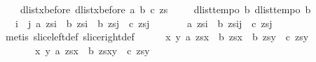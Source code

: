 \begin{isabellebody}
\ \ \ \ {\isacharparenleft}dlist{\isacharunderscore}xbefore\ {\isacharparenleft}dlist{\isacharunderscore}xbefore\ a\ b{\isacharparenright}\ c{\isacharparenright}\ zs{\isachardoublequoteclose}\isanewline
%
\isadelimproof
%
\endisadelimproof
%
\isatagproof
{}\isamarkupfalse%
{\isacharminus}\isanewline
\ \ \isamarkupfalse%
\ {}{\isacharcolon}\ {\isachardoublequoteopen}dlist{\isacharunderscore}tempo{}\ b{\isachardoublequoteclose}\ {\isachardoublequoteopen}dlist{\isacharunderscore}tempo{}\ b{\isachardoublequoteclose}\ \isanewline
\ \ \isamarkupfalse%
\ {}{\isacharcolon}\ {\isachardoublequoteopen}{\isasymexists}\ i{\isachardot}\ {\isacharparenleft}{\isasymexists}\ j{\isachardot}\ a\ {\isacharparenleft}zs{\isasymdagger}{\isachardot}{\isachardot}i{\isacharparenright}\ {\isasymand}\ b\ {\isacharparenleft}zs{\isasymdagger}i{\isachardot}{\isachardot}{\isacharparenright}\ {\isasymand}\ b\ {\isacharparenleft}zs{\isasymdagger}{\isachardot}{\isachardot}j{\isacharparenright}\ {\isasymand}\ c\ {\isacharparenleft}zs{\isasymdagger}j{\isachardot}{\isachardot}{\isacharparenright}\ {\isasymlongleftrightarrow}\isanewline
\ \ \ \ \ \ a\ {\isacharparenleft}zs{\isasymdagger}{\isachardot}{\isachardot}i{\isacharparenright}\ {\isasymand}\ b\ {\isacharparenleft}zs{\isasymdagger}i{\isachardot}{\isachardot}j{\isacharparenright}\ {\isasymand}\ c\ {\isacharparenleft}zs{\isasymdagger}j{\isachardot}{\isachardot}{\isacharparenright}{\isacharparenright}{\isachardoublequoteclose}\isanewline
\ \ \ \ \isamarkupfalse%
\ {\isacharparenleft}metis\ slice{\isacharunderscore}left{\isacharunderscore}def\ slice{\isacharunderscore}right{\isacharunderscore}def{\isacharparenright}\isanewline
\ \ \isamarkupfalse%
\ {}{\isacharcolon}\ {\isachardoublequoteopen}{\isacharparenleft}{\isasymexists}\ x\ y{\isachardot}\ a\ {\isacharparenleft}zs{\isasymdagger}{\isachardot}{\isachardot}x{\isacharparenright}\ {\isasymand}\ b\ {\isacharparenleft}zs{\isasymdagger}x{\isachardot}{\isachardot}{\isacharparenright}\ {\isasymand}\ b\ {\isacharparenleft}zs{\isasymdagger}{\isachardot}{\isachardot}y{\isacharparenright}\ {\isasymand}\ c\ {\isacharparenleft}zs{\isasymdagger}y{\isachardot}{\isachardot}{\isacharparenright}{\isacharparenright}\ {\isasymlongleftrightarrow}\isanewline
\ \ \ \ \ \ {\isacharparenleft}{\isasymexists}\ x\ y{\isachardot}\ a\ {\isacharparenleft}zs{\isasymdagger}{\isachardot}{\isachardot}x{\isacharparenright}\ {\isasymand}\ b\ {\isacharparenleft}zs{\isasymdagger}x{\isachardot}{\isachardot}y{\isacharparenright}\ {\isasymand}\ c\ {\isacharparenleft}zs{\isasymdagger}y{\isachardot}{\isachardot}{\isacharparenright}{\isacharparenright}{\isachardoublequoteclose}\isanewline

\end{isabellebody}
